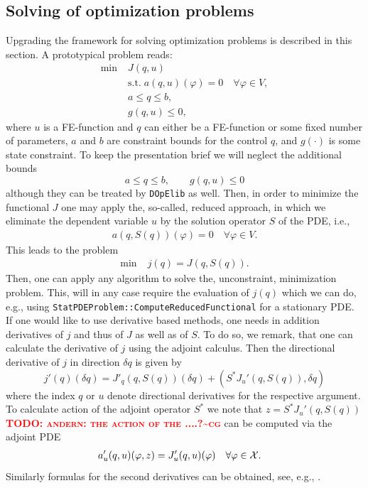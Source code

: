 \documentclass[prodmode,acmtoms]{acmsmall}
\numberwithin{equation}{section}
\renewcommand{\phi}{\varphi}
\newcommand{\dope}{\texttt{DOpElib}}
\newcommand{\todocg}[1]{\textbf{\textsc{\textcolor{red}{TODO: #1\textasciitilde cg}}}}
\begin{document}
\subsection{Solving of optimization problems}\label{sec:opt}
Upgrading the framework for solving optimization problems
is described in this section. A prototypical problem reads:
\begin{align*}
\min\;&J(q,u) \\
  &\text{s.t.}\; a(q,u)(\phi) = 0 \quad \forall \phi\in V,\\
  &a \le q \le b,\\
  &g(q,u) \le 0,  
\end{align*}
where $u$ is a FE-function and $q$ can either be a FE-function or some 
fixed number of parameters, $a$ and $b$ are constraint bounds for the control $q$,
and $g(\cdot)$ is some state constraint.
To keep the presentation brief we will neglect the additional bounds
\[
a \le q \le b,\qquad g(q,u) \le 0
\]
although they can be treated by \dope{} as well.
Then, in order to minimize the functional $J$ one may apply the, so-called, 
reduced approach, in which we eliminate the dependent variable $u$ by the solution 
operator $S$ of the PDE, i.e., 
\begin{align*}
a(q,S(q))(\phi) = 0 \quad \forall \phi\in V. 
\end{align*}
This leads to the problem
\begin{align*}
\min\;&j(q) = J(q,S(q)). 
\end{align*}
Then, one can apply any algorithm to solve the, unconstraint, minimization 
problem. This, will in any case require the evaluation of $j(q)$ which 
we can do, e.g., using \texttt{StatPDEProblem::ComputeReducedFunctional} for 
a stationary PDE. If one would like to use derivative based methods, one 
needs in addition derivatives of $j$ and thus of $J$ as well as of $S$. 
To do so, we remark, that one can calculate the derivative of 
$j$ using the adjoint calculus. Then the directional derivative 
of $j$ in direction $\delta q$ is given by
\[
j'(q)(\delta q) = J'_q(q,S(q))(\delta q) + (S^* J_u'(q,S(q)),\delta q)
\]
where the index $q$ or $u$ denote directional derivatives for the 
respective argument. To calculate action of the adjoint operator $S^*$ 
we note that $z =  S^* J_u'(q,S(q))$ \todocg{andern: the action of the ....?}
can be computed via the adjoint PDE
\begin{equation}
  \label{opt_KKT_system}
  \begin{aligned}
    a_{u}'(q,u)(\phi , z) &= J'_{u}(q,u)(\phi) & \forall \phi&\in {\cal X}.
  \end{aligned}
\end{equation}
Similarly formulas for the second derivatives can be obtained, see, e.g., 
\cite{BeMeVe06}.
\end{document}
